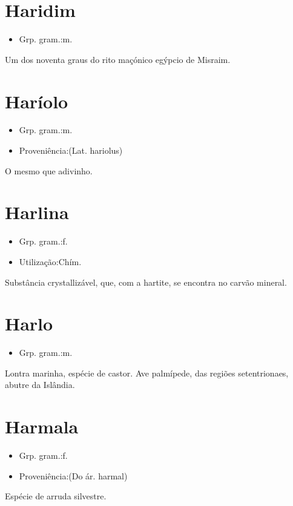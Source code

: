 \documentclass{article}
\begin{document}
\section{Haridim}
\begin{itemize}
\item {Grp. gram.:m.}
\end{itemize}
Um dos noventa graus do rito maçónico egýpcio de Misraim.
\section{Haríolo}
\begin{itemize}
\item {Grp. gram.:m.}
\end{itemize}
\begin{itemize}
\item {Proveniência:(Lat. \textunderscore hariolus\textunderscore )}
\end{itemize}
O mesmo que \textunderscore adivinho\textunderscore .
\section{Harlina}
\begin{itemize}
\item {Grp. gram.:f.}
\end{itemize}
\begin{itemize}
\item {Utilização:Chím.}
\end{itemize}
Substância crystallizável, que, com a hartite, se encontra no carvão mineral.
\section{Harlo}
\begin{itemize}
\item {Grp. gram.:m.}
\end{itemize}
Lontra marinha, espécie de castor.
Ave palmípede, das regiões setentrionaes, abutre da Islândia.
\section{Harmala}
\begin{itemize}
\item {Grp. gram.:f.}
\end{itemize}
\begin{itemize}
\item {Proveniência:(Do ár. \textunderscore harmal\textunderscore )}
\end{itemize}
Espécie de arruda silvestre.
\end{document}
